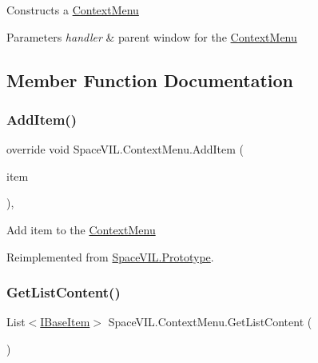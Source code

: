 Constructs a \mbox{\hyperlink{class_space_v_i_l_1_1_context_menu}{Context\+Menu}} 


\begin{DoxyParams}{Parameters}
{\em handler} & parent window for the \mbox{\hyperlink{class_space_v_i_l_1_1_context_menu}{Context\+Menu}} \\
\hline
\end{DoxyParams}


\subsection{Member Function Documentation}
\mbox{\label{class_space_v_i_l_1_1_context_menu_a17241424bae3270513087c3adaef5b2e}} 
\subsubsection{\texorpdfstring{Add\+Item()}{AddItem()}}
{\footnotesize\ttfamily override void Space\+V\+I\+L.\+Context\+Menu.\+Add\+Item (\begin{DoxyParamCaption}\item[{\mbox{\hyperlink{interface_space_v_i_l_1_1_core_1_1_i_base_item}{I\+Base\+Item}}}]{item }\end{DoxyParamCaption})\hspace{0.3cm}{\ttfamily [inline]}, {\ttfamily [virtual]}}



Add item to the \mbox{\hyperlink{class_space_v_i_l_1_1_context_menu}{Context\+Menu}} 



Reimplemented from \mbox{\hyperlink{class_space_v_i_l_1_1_prototype}{Space\+V\+I\+L.\+Prototype}}.

\mbox{\label{class_space_v_i_l_1_1_context_menu_a9cc6b338e39d87a707c2a873f089de0d}} 
\subsubsection{\texorpdfstring{Get\+List\+Content()}{GetListContent()}}
{\footnotesize\ttfamily List$<$\mbox{\hyperlink{interface_space_v_i_l_1_1_core_1_1_i_base_item}{I\+Base\+Item}}$>$ Space\+V\+I\+L.\+Context\+Menu.\+Get\+List\+Content (\begin{DoxyParamCaption}{ }\end{DoxyParamCaption})\hspace{0.3cm}{\ttfamily [inline]}}



